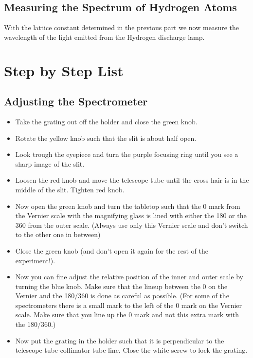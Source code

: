 \subsection{Measuring the Spectrum of Hydrogen Atoms}
With the lattice constant determined in the previous part we now measure the wavelength of the light emitted from the Hydrogen discharge lamp. 

\section{Step by Step List}
\subsection{Adjusting the Spectrometer}
\begin{itemize}
\item Take the grating out off the holder and close the green knob.

\item Rotate the yellow knob such that the slit is about half open.

\item Look trough the eyepiece and turn the purple focusing ring until you see a sharp image of the slit.

\item Loosen the red knob and move the telescope tube until the cross hair is in the middle of the slit. Tighten red knob.

\item Now open the green knob and turn the tabletop such that the 0 mark from the Vernier scale with the magnifying glass is lined with either the 180 or the 360 from the outer scale. (Always use only this Vernier scale and don't switch to the other one in between)

\item Close the green knob (and don't open it again for the rest of the experiment!).

\item Now you can fine adjust the relative position of the inner and outer scale by turning the blue knob. Make sure that the lineup between the 0 on the Vernier and the 180/360 is done as careful as possible. (For some of the spectrometers there is a small mark to the left of the 0 mark on the Vernier scale. Make sure that you line up the 0 mark and not this extra mark with the 180/360.)

\item Now put the grating in the holder such that it is perpendicular to the telescope tube-collimator tube line. Close the white screw to lock the grating.
\end{itemize}

